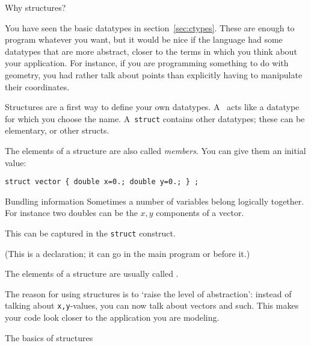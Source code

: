 
 {Why structures?}
\label{sec:struct}

You have seen the basic datatypes in section~\ref{sec:ctypes}. These
are enough to program whatever you want, but it would be nice if the
language had some datatypes that are more abstract, closer to the
terms in which you think about your application. For instance, if you
are programming something to do with geometry, you had rather talk
about points than explicitly having to manipulate their coordinates.

Structures are a
first way to define your own datatypes. A~
acts like a datatype for which you choose the name. A~\lstinline$struct$
contains other datatypes; these can be elementary, or other structs.
%

The elements of a structure are also called
\emph{members}.
You can give them an initial value:
\begin{lstlisting}
struct vector { double x=0.; double y=0.; } ;
\end{lstlisting}
  
\begin{slide}{Bundling information}
  \label{sl:struct-why}
  Sometimes a number of variables belong logically together. For
  instance two doubles can be the $x,y$ components of a vector.

  This can be captured in the \lstinline$struct$ construct.


  (This is a declaration; it can go in the main program or before it.)

The elements of a structure are usually called .
\end{slide}

The reason for using structures is to `raise the level of
abstraction': instead of talking about \lstinline{x,y}-values, you can
now talk about vectors and such. This makes your code look closer to
the application you are modeling.

 {The basics of structures}

